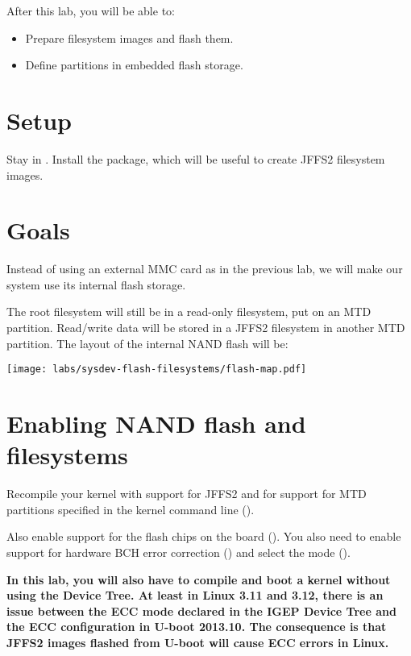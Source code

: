 
After this lab, you will be able to:
\begin{itemize}
\item Prepare filesystem images and flash them.
\item Define partitions in embedded flash storage.
\end{itemize}

\section{Setup}

Stay in . Install the
 package, which will be useful to create JFFS2
filesystem images.

\section{Goals}

Instead of using an external MMC card as in the previous lab, we will
make our system use its internal flash storage.

The root filesystem will still be in a read-only filesystem, put on an
MTD partition.  Read/write data will be stored in a JFFS2 filesystem
in another MTD partition. The layout of the internal NAND flash will
be:

\begin{center}
  \texttt{[image: labs/sysdev-flash-filesystems/flash-map.pdf]}
\end{center}

\section{Enabling NAND flash and filesystems}

Recompile your kernel with support for JFFS2 and for support for MTD
partitions specified in the kernel command line
().

Also enable support for the flash chips on the board
(). You also need to enable support for
hardware BCH error correction () and select
the  mode
().

{\bf In this lab, you will also have to compile and boot a kernel without
using the Device Tree. At least in Linux 3.11 and 3.12, there is an
issue between the ECC mode declared in the IGEP Device Tree and the ECC
configuration in U-boot 2013.10. The consequence is that JFFS2 images
flashed from U-boot will cause ECC errors in Linux.}

